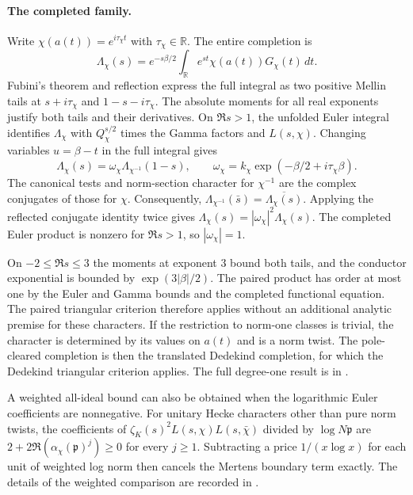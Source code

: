 \documentclass[11pt]{amsart}
\theoremstyle{definition}
\theoremstyle{remark}
\numberwithin{equation}{section}
\begin{document}
\paragraph{The completed family.}
Write \(\chi(a(t))=e^{i\tau_\chi t}\) with \(\tau_\chi\in\mathbb R\).
The entire completion is
\[
  \Lambda_\chi(s)=e^{-s\beta/2}
      \int_{\mathbb R}e^{st}\chi(a(t))G_\chi(t)\,dt .
\]
Fubini's theorem and reflection express the full integral as
two positive Mellin tails at \(s+i\tau_\chi\) and
\(1-s-i\tau_\chi\). The absolute moments for all real exponents
justify both tails and their derivatives. On \(\Re s>1\), the
unfolded Euler integral identifies \(\Lambda_\chi\) with
\(Q_\chi^{s/2}\) times the Gamma factors and \(L(s,\chi)\).
Changing variables \(u=\beta-t\) in the full integral gives
\[
  \Lambda_\chi(s)=\omega_\chi\Lambda_{\chi^{-1}}(1-s),\qquad
  \omega_\chi=k_\chi\exp(-\beta/2+i\tau_\chi\beta).
\]
The canonical tests and norm-section character for \(\chi^{-1}\)
are the complex conjugates of those for \(\chi\). Consequently,
\(\Lambda_{\chi^{-1}}(\bar s)=\overline{\Lambda_\chi(s)}\).
Applying the reflected conjugate identity twice gives
\(\Lambda_\chi(s)=|\omega_\chi|^2\Lambda_\chi(s)\).
The completed Euler product is nonzero for \(\Re s>1\), so
\(|\omega_\chi|=1\).

On \(-2\le\Re s\le3\) the moments at exponent \(3\) bound both
tails, and the conductor exponential is bounded by
\(\exp(3|\beta|/2)\). The paired product has order at most one by
the Euler and Gamma bounds and the completed functional equation.
The paired triangular criterion therefore applies without an
additional analytic premise for these characters. If the restriction
to norm-one classes is trivial, the character is determined by
its values on \(a(t)\) and is a norm twist. The pole-cleared
completion is then the translated Dedekind completion, for which
the Dedekind triangular criterion applies. The full degree-one
result is in .

A weighted all-ideal bound can also be obtained when the
logarithmic Euler coefficients are nonnegative. For unitary Hecke
characters other than pure norm twists, the coefficients of
$\zeta_K(s)^2L(s,\chi)L(s,\bar\chi)$ divided by $\log N\mathfrak p$
are $2+2\Re(\alpha_\chi(\mathfrak p)^j)\ge0$ for every $j\ge1$.
Subtracting a price $1/(x\log x)$ for each unit of weighted log norm
then cancels the Mertens boundary term exactly. The details of the
weighted comparison are recorded in .
\end{document}
